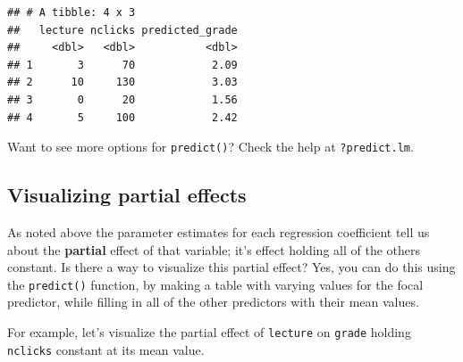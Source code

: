 \documentclass[]{book}
\newenvironment{Shaded}{\begin{snugshade}}{\end{snugshade}}
\newcommand{\CommentTok}[1]{\textcolor[rgb]{0.56,0.35,0.01}{\textit{#1}}}
\newcommand{\DataTypeTok}[1]{\textcolor[rgb]{0.13,0.29,0.53}{#1}}
\newcommand{\DecValTok}[1]{\textcolor[rgb]{0.00,0.00,0.81}{#1}}
\newcommand{\KeywordTok}[1]{\textcolor[rgb]{0.13,0.29,0.53}{\textbf{#1}}}
\newcommand{\NormalTok}[1]{#1}
\newcommand{\OperatorTok}[1]{\textcolor[rgb]{0.81,0.36,0.00}{\textbf{#1}}}
\newcommand{\StringTok}[1]{\textcolor[rgb]{0.31,0.60,0.02}{#1}}
\begin{document}
\begin{verbatim}
## # A tibble: 4 x 3
##   lecture nclicks predicted_grade
##     <dbl>   <dbl>           <dbl>
## 1       3      70            2.09
## 2      10     130            3.03
## 3       0      20            1.56
## 4       5     100            2.42
\end{verbatim}

Want to see more options for \texttt{predict()}? Check the help at \texttt{?predict.lm}.

\hypertarget{visualizing-partial-effects}{%
\subsection{Visualizing partial effects}\label{visualizing-partial-effects}}

As noted above the parameter estimates for each regression coefficient tell us about the \textbf{partial} effect of that variable; it's effect holding all of the others constant. Is there a way to visualize this partial effect? Yes, you can do this using the \texttt{predict()} function, by making a table with varying values for the focal predictor, while filling in all of the other predictors with their mean values.

For example, let's visualize the partial effect of \texttt{lecture} on \texttt{grade} holding \texttt{nclicks} constant at its mean value.

\begin{Shaded}
\end{Shaded}
\end{document}
